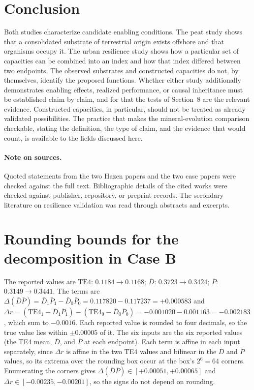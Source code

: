 \documentclass[11pt]{article}
\theoremstyle{definition}
\theoremstyle{remark}
\begin{document}
\section{Conclusion}

Both studies characterize candidate enabling conditions. The peat study shows that a consolidated substrate of terrestrial origin exists offshore and that organisms occupy it. The urban resilience study shows how a particular set of capacities can be combined into an index and how that index differed between two endpoints. The observed substrates and constructed capacities do not, by themselves, identify the proposed functions. Whether either study additionally demonstrates enabling effects, realized performance, or causal inheritance must be established claim by claim, and for that the tests of Section~8 are the relevant evidence. Constructed capacities, in particular, should not be treated as already validated possibilities. The practice that makes the mineral-evolution comparison checkable, stating the definition, the type of claim, and the evidence that would count, is available to the fields discussed here.

\paragraph{Note on sources.} Quoted statements from the two Hazen papers and the two case papers were checked against the full text. Bibliographic details of the cited works were checked against publisher, repository, or preprint records. The secondary literature on resilience validation was read through abstracts and excerpts.

\appendix
\section{Rounding bounds for the decomposition in Case B}
The reported values are $\overline{\mathrm{TE4}}$: $0.1184\to0.1168$; $\bar D$: $0.3723\to0.3424$; $\bar P$: $0.3149\to0.3441$. The terms are $\Delta(\bar D\bar P)=\bar D_1\bar P_1-\bar D_0\bar P_0=0.117820-0.117237=+0.000583$ and $\Delta r=(\overline{\mathrm{TE4}}_1-\bar D_1\bar P_1)-(\overline{\mathrm{TE4}}_0-\bar D_0\bar P_0)=-0.001020-0.001163=-0.002183$, which sum to $-0.0016$. Each reported value is rounded to four decimals, so the true value lies within $\pm0.00005$ of it. The six inputs are the six reported values (the TE4 mean, $\bar D$, and $\bar P$ at each endpoint). Each term is affine in each input separately, since $\Delta r$ is affine in the two TE4 values and bilinear in the $\bar D$ and $\bar P$ values, so its extrema over the rounding box occur at the box's $2^6=64$ corners. Enumerating the corners gives $\Delta(\bar D\bar P)\in[+0.00051,+0.00065]$ and $\Delta r\in[-0.00235,-0.00201]$, so the signs do not depend on rounding.
\end{document}
